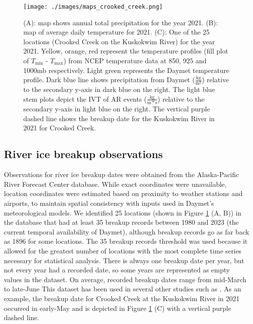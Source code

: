 \documentclass[12pts,draft]{AR_analysis_}
\begin{document}
\begin{figure}
\centering
\texttt{[image: ./images/maps\_crooked\_creek.png]}
	\caption{(A): map shows annual total precipitation for the
	year 2021. (B): map of average daily temperature for 2021. (C):
	One of the 25 locations (Crooked Creek on the Kuskokwim
	River) for the year 2021. Yellow, orange, red represent the
	temperature profiles (fill plot of $T_{\text{min}}$ -
	$T_{\text{max}}$) from NCEP
	temperature data at 850, 925 and 1000mb respectively. Light
	green represents the Daymet temperature profile. Dark blue line shows
	precipitation from Daymet ($\mathrm{\frac{kg}{m^{2}}}$) 
	relative to the secondary y-axis in dark blue
	on the right. The light blue stem
	plots depict the IVT of AR events ($\mathrm{\frac{kg}{m*s}}$) 
	relative to the secondary y-axis in light blue
	on the right. The vertical purple dashed line shows the breakup
	date for the Kuskokwim River in 2021 for Crooked Creek.}
\label{fig:maps_crooked_creek} 
\end{figure}

\subsection{River ice breakup observations}

Observations for river ice breakup dates 
were obtained from the Alaska-Pacific River Forecast Center database.
While exact coordinates were unavailable, location coordinates
were estimated based on proximity to weather stations and airports, to 
maintain spatial consistency with inputs used in Daymet’s meteorological 
models. We identified 25 locations (shown in Figure 
\ref{fig:maps_crooked_creek} (A, B)) in the database that had
at least 35 breakup records between 1980 and 2023 
(the current temporal availability of 
Daymet), although breakup records go as far back as 1896 for some 
locations. The 35 breakup records threshold was used because it 
allowed for the greatest 
number of locations with the most complete time series 
necessary for statistical analysis. There is always one breakup 
date per year, but not every year had a recorded date, so some 
years are represented as empty values in the dataset. On average, 
recorded breakup dates range from mid-March to late-June 
This dataset has been used in several other studies such as 
\cite{murphy2022, Brown2018, Bieniek2011}. As an example, 
the breakup date for Crooked Creek 
at the Kuskokwim River in 2021 occurred in early-May and
is depicted in Figure 
\ref{fig:maps_crooked_creek} (C) with a 
vertical purple dashed line.
\end{document}
